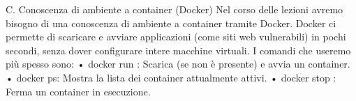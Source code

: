 \documentclass[11pt,a4paper]{article}
\begin{document}
C. Conoscenza di ambiente a container (Docker) Nel corso delle lezioni
avremo bisogno di una conoscenza di ambiente a container tramite Docker.
Docker ci permette di scaricare e avviare applicazioni (come siti web
vulnerabili) in pochi secondi, senza dover configurare intere macchine
virtuali. I comandi che useremo più spesso sono: • docker run : Scarica
(se non è presente) e avvia un container. • docker ps: Mostra la lista
dei container attualmente attivi. • docker stop : Ferma un container in
esecuzione.


\end{document}
